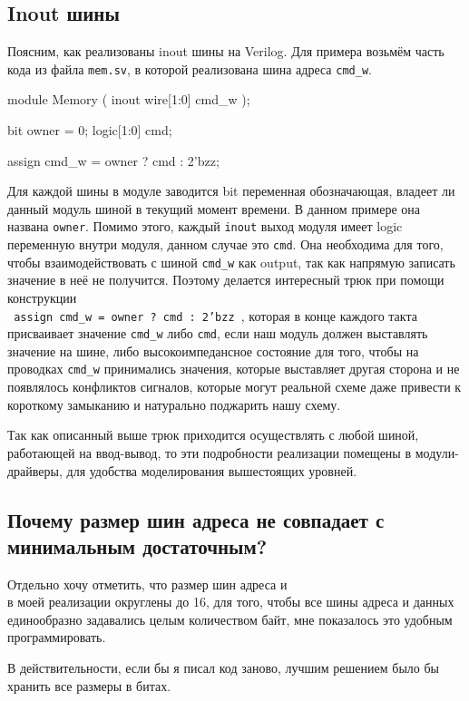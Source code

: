 \documentclass[14pt, russian, onesize]{extreport}
\begin{document}
\subsection*{ Inout шины }
Поясним, как реализованы inout шины на Verilog. Для примера
возьмём часть кода из файла \texttt{mem.sv}, в которой
реализована шина адреса \texttt{cmd\_w}.
\begin{svcode}
module Memory
    (
        inout wire[1:0] cmd_w
    );

    bit owner = 0;
    logic[1:0] cmd;

    assign cmd_w = owner ? cmd : 2'bzz;

\end{svcode}
Для каждой шины в модуле 
заводится bit переменная обозначающая, владеет ли данный модуль
шиной в текущий момент времени. В данном примере она названа \texttt{owner}.
Помимо этого, каждый \texttt{inout} 
выход модуля имеет logic переменную внутри модуля, данном
случае это \texttt{cmd}. Она необходима
для того, чтобы взаимодействовать с шиной \texttt{cmd\_w} как output,
так как напрямую записать значение в неё не получится. Поэтому
делается интересный трюк при помощи конструкции\\
\texttt{ assign cmd_w = owner ? cmd : 2'bzz },
которая в конце каждого такта присваивает значение \texttt{cmd\_w}
либо \texttt{cmd}, если наш модуль должен выставлять значение
на шине, либо высокоимпедансное состояние для того, чтобы
на проводках \texttt{cmd\_w} принимались значения, которые 
выставляет другая сторона и не появлялось конфликтов сигналов,
которые могут реальной схеме даже привести к короткому замыканию
и натурально поджарить нашу схему. 

Так как описанный выше трюк приходится осуществлять с любой
шиной, работающей на ввод-вывод, то эти подробности реализации
помещены в модули-драйверы, для удобства моделирования вышестоящих
уровней.
\subsection*{ Почему размер шин адреса не совпадает с минимальным достаточным? }
Отдельно хочу отметить, что размер шин адреса 
 и\\  в моей реализации
округлены до 16, для того, чтобы все шины адреса и данных единообразно
задавались целым количеством байт, мне показалось это удобным программировать.

В действительности, если бы я писал код заново, лучшим решением было бы
хранить все размеры в битах.
\end{document}

